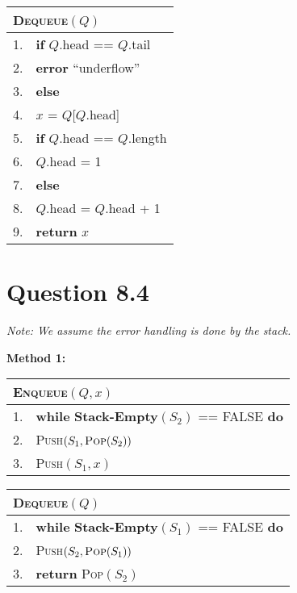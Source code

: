 \documentclass[a4paper,12pt]{article}
\begin{document}
\begin{center}
	\begin{tabular}{ll}
		\toprule
		\multicolumn{2}{l}{\textsc{Dequeue}$(Q)$} \\
		\midrule
		1. & \textbf{if} $Q$.head == $Q$.tail \\
		2. & \quad \textbf{error} ``underflow'' \\
		3. & \textbf{else} \\
		4. & \quad $x$ = $Q$[$Q$.head] \\
		5. & \quad \textbf{if} $Q$.head == $Q$.length \\
		6. & \quad \quad $Q$.head = 1 \\
		7. & \quad \textbf{else} \\
		8. & \quad \quad $Q$.head = $Q$.head + 1 \\
		9. & \quad \textbf{return} $x$ \\
		\bottomrule
	\end{tabular}
\end{center}

\section*{Question 8.4}

\textit{Note: We assume the error handling is done by the stack.}

\textbf{Method 1:}
\begin{center}
	\begin{tabular}{ll}
		\toprule
		\multicolumn{2}{l}{\textsc{Enqueue}$(Q,x)$} \\
		\midrule
		1. & \textbf{while} \textbf{Stack-Empty}$(S_2)$ == FALSE \textbf{do} \\
		2. & \quad \textsc{Push}$(S_1,\textsc{Pop}(S_2))$ \\
		3. & \textsc{Push}$(S_1,x)$ \\
		\bottomrule
	\end{tabular}
\end{center}

\begin{center}
	\begin{tabular}{ll}
		\toprule
		\multicolumn{2}{l}{\textsc{Dequeue}$(Q)$} \\
		\midrule
		1. & \textbf{while} \textbf{Stack-Empty}$(S_1)$ == FALSE \textbf{do} \\
		2. & \quad \textsc{Push}$(S_2,\textsc{Pop}(S_1))$ \\
		3. & \textbf{return} \textsc{Pop}$(S_2)$ \\
		\bottomrule
	\end{tabular}
\end{center}
\end{document}
